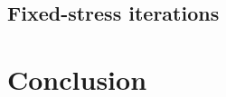 \documentclass[a4paper]{article}
\def\div{\operatorname{div}}
\def\ep{\vc\varepsilon}
\def\ff{\vc f}
\def\prtl{\partial}
\def\tn#1{{\mathbb{#1}}}    %
\def\uu{\vc u}
\def\vc#1{\mathbf{\boldsymbol{#1}}}     %
\begin{document}
\subsection{Fixed-stress iterations}


\section*{Conclusion}









% 
\end{document}
